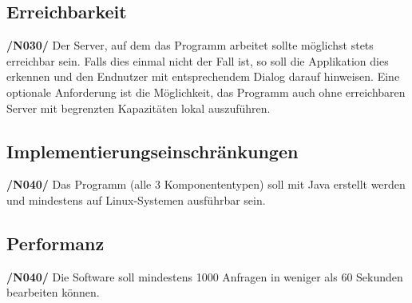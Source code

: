 \documentclass[11pt]{article} %
\begin{document}
\subsection{Erreichbarkeit}

\textbf{/N030/} Der Server, auf dem das Programm arbeitet sollte möglichst stets erreichbar sein. Falls dies einmal nicht der Fall ist, so soll die Applikation dies erkennen und den Endnutzer mit entsprechendem Dialog darauf hinweisen. Eine optionale Anforderung ist die Möglichkeit, das Programm auch ohne erreichbaren Server mit begrenzten Kapazitäten lokal auszuführen.

\subsection{Implementierungseinschränkungen}

\textbf{/N040/} Das Programm (alle 3 Komponententypen) soll mit Java erstellt werden und mindestens auf Linux-Systemen ausführbar sein.

\subsection{Performanz}

\textbf{/N040/} Die Software soll mindestens 1000 Anfragen in weniger als 60 Sekunden bearbeiten können.
\end{document}
